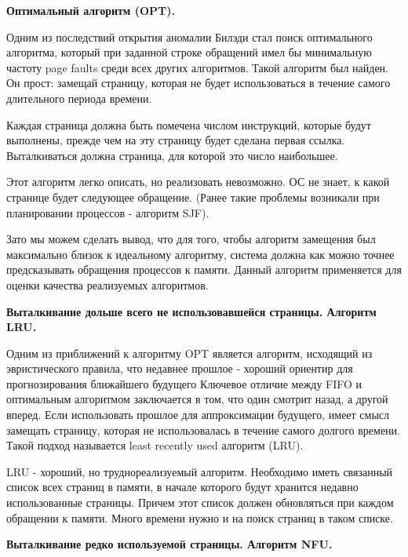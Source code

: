 \begin{center}{\bfseries Оптимальный алгоритм (OPT).}
\end{center}

Одним из последствий открытия аномалии Билэди стал поиск оптимального алгоритма, который при заданной строке обращений имел бы минимальную частоту page faults среди всех других алгоритмов. Такой алгоритм был найден. Он прост: замещай страницу, которая не будет использоваться в течение самого длительного периода времени.

Каждая страница должна быть помечена числом инструкций, которые будут выполнены, прежде чем на эту страницу будет сделана первая ссылка. Выталкиваться должна страница, для которой это число наибольшее.

Этот алгоритм легко описать, но реализовать невозможно. ОС не знает, к какой странице будет следующее обращение. (Ранее такие проблемы возникали при планировании процессов - алгоритм SJF).

Зато мы можем сделать вывод, что для того, чтобы алгоритм замещения был максимально близок к идеальному алгоритму, система должна как можно точнее предсказывать обращения процессов к памяти. Данный алгоритм применяется для оценки качества реализуемых алгоритмов.

\begin{center}{\bfseries Выталкивание дольше всего не использовавшейся страницы. Алгоритм LRU.}
\end{center}

Одним из приближений к алгоритму OPT является алгоритм, исходящий из эвристического правила, что недавнее прошлое - хороший ориентир для прогнозирования ближайшего будущего Ключевое отличие между FIFO и оптимальным алгоритмом заключается в том, что один смотрит назад, а другой вперед. Если использовать прошлое для аппроксимации будущего, имеет смысл замещать страницу, которая не использовалась в течение самого долгого времени. Такой подход называется least recently used алгоритм (LRU). 

LRU - хороший, но труднореализуемый алгоритм. Необходимо иметь связанный список всех страниц в памяти, в начале которого будут хранится недавно использованные страницы. Причем этот список должен обновляться при каждом обращении к памяти. Много времени нужно и на поиск страниц в таком списке.

\begin{center}{\bfseries Выталкивание редко используемой страницы. Алгоритм NFU.}
\end{center}


